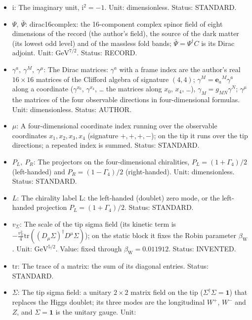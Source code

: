 \documentclass[
  10pt,
]{article}
\begin{document}
\begin{itemize}
  (removed).
\item
  \(\mathrm{i}\): The imaginary unit, \(\mathrm{i}^2 = -1\). Unit:
  dimensionless. Status: STANDARD.
\item
  \(\Psi,\ \bar\Psi\): dirac16complex: the 16-component complex spinor
  field of eight dimensions of the record (the author's field), the
  source of the dark matter (its lowest odd level) and of the massless
  fold bands; \(\bar\Psi = \Psi^\dagger C\) is its Dirac adjoint. Unit:
  \(\mathrm{GeV}^{7/2}\). Status: RECORD.
\item
  \(\gamma^a,\ \gamma^M,\ \gamma^\mu\): The Dirac matrices: \(\gamma^a\)
  with a frame index are the author's real \(16 \times 16\) matrices of
  the Clifford algebra of signature \((4, 4)\);
  \(\gamma^M = \mathbf{e}_a{}^M\gamma^a\) along a coordinate
  (\(\gamma^{x_0}\), \(\gamma^{x_4}\), \ldots{} the matrices along
  \(x_0\), \(x_4\), \ldots), \(\gamma_M = g_{MN}\gamma^N\);
  \(\gamma^\mu\) the matrices of the four observable directions in
  four-dimensional formulas. Unit: dimensionless. Status: AUTHOR.
\item
  \(\mu\): A four-dimensional coordinate index running over the
  observable coordinates \(x_1, x_2, x_3, x_4\) (signature \(+,+,+,-\));
  on the tip it runs over the tip directions; a repeated index is
  summed. Status: STANDARD.
\item
  \(P_L,\ P_R\): The projectors on the four-dimensional chiralities,
  \(P_L = (1 + \Gamma_4)/2\) (left-handed) and
  \(P_R = (1 - \Gamma_4)/2\) (right-handed). Unit: dimensionless.
  Status: STANDARD.
\item
  \(L\): The chirality label L: the left-handed (doublet) zero mode, or
  the left-handed projection \(P_L = (1 + \Gamma_4)/2\). Status:
  STANDARD.
\item
  \(v_\Sigma\): The scale of the tip sigma field (its kinetic term is
  \(-\frac{v_\Sigma^2}{4}\mathrm{tr}((D_\mu\Sigma)^\dagger D^\mu\Sigma)\));
  on the static block it fixes the Robin parameter
  \(\beta_{\mathrm{W}}\). Unit: \(\mathrm{GeV}^{5/2}\). Value: fixed
  through \(\beta_{\mathrm{W}} = 0.011912\). Status: INVENTED.
\item
  \(\mathrm{tr}\): The trace of a matrix: the sum of its diagonal
  entries. Status: STANDARD.
\item
  \(\Sigma\): The tip sigma field: a unitary \(2 \times 2\) matrix field
  on the tip (\(\Sigma^\dagger\Sigma = \mathbf{1}\)) that replaces the
  Higgs doublet; its three modes are the longitudinal \(W^+\), \(W^-\)
  and \(Z\), and \(\Sigma = \mathbf{1}\) is the unitary gauge. Unit:

\end{itemize}
\end{document}
